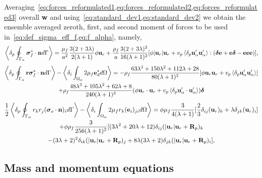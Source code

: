 Averaging~\ref{eq:forces_reformulated1,eq:forces_reformulated2,eq:forces_reformulated3} overall \textbf{w} and using~\ref{eq:standard_dev1,eq:standard_dev2} we obtain the ensemble averaged zeroth, first, and second moment of forces to be used in~\ref{eq:def_sigma_eff_f,eq:f_alpha}, namely, 
\begin{multline}
    \label{eq:forces_reformulated1_avg}
    \pSavg{\bm\sigma_f^*\cdot \textbf{n}}
    =
    \frac{\mu_f}{a^2}  \frac{3(2+3\lambda)}{2(\lambda+1)} \phi \textbf{u}_r 
    + \frac{\rho_f}{a} \frac{3 (2+3\lambda)^2}{16 (\lambda+1)^2}
    [\phi |\textbf{u}_r| \textbf{u}_r+ v_p \pavg{ \textbf{u}_\alpha'\textbf{u}_\alpha'}:
    (\bm\delta \textbf{e} +\textbf{e} \bm\delta  - \textbf{eee})]
    ,
\end{multline}    
\begin{multline}    
    \pSavg{\textbf{r}\bm\sigma_f^*\cdot \textbf{n}}
    - \pOavg[i]{2\mu_f \textbf{e}^*_d}
    = 
    - \rho_f  \frac{63 \lambda^{3} + 150 \lambda^{2} + 112 \lambda + 28}{80 (\lambda+1)^{3}} [\phi \textbf{u}_r \textbf{u}_r + v_p \pavg{\textbf{u}_\alpha'\textbf{u}_\alpha'} ] \\ 
    + \rho_f   \frac{48\lambda^3 + 105 \lambda^2 + 62\lambda + 8}{240 (\lambda+1)^3} (\phi \textbf{u}_r\cdot \textbf{u}_r+ v_p \pavg{\textbf{u}_\alpha'\cdot \textbf{u}_\alpha'}) \bm\delta\\
    \label{eq:forces_reformulated2_avg}
\end{multline}    
\begin{multline}
    \frac{1}{2}\pSavg{r_kr_j ( \bm\sigma_{o}\cdot \textbf{n})_i}
    - \pOavg[i]{2 \mu_f r_k (\textbf{e}_i)_{ji}}
    =
    \phi \mu_f \frac{ 3}{4(\lambda+1)} [
        \frac{2}{3}\delta_{ij} (\textbf{u}_r)_k 
        + \lambda \delta_{jk} (\textbf{u}_r)_i
    ]\\ 
    + \phi \rho_f 
    \frac{3}{256(\lambda+1)^2} [
    (3\lambda^2+20\lambda +12) \delta_{ij} ( |\textbf{u}_r| \textbf{u}_r+\textbf{R}_p)_k\\
    -( 3\lambda+2)^2 \delta_{ik} (|\textbf{u}_r| \textbf{u}_r+\textbf{R}_p)_j
    + 8 \lambda (3\lambda+2)\delta_{jk}  (|\textbf{u}_r| \textbf{u}_r +\textbf{R}_p)_i
    ], 
    \label{eq:forces_reformulated3_avg}
\end{multline}

\subsection{Mass and momentum equations}

